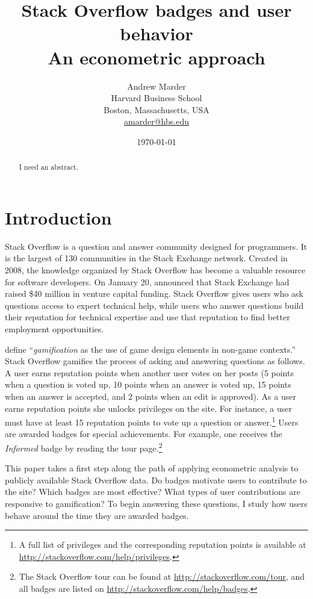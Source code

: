 \documentclass[conference]{IEEEtran}
\title{
  Stack Overflow badges and user behavior \\
  An econometric approach
}
\author{
  Andrew Marder \\
  Harvard Business School \\
  Boston, Massachusetts, USA \\
  \href{mailto:amarder@hbs.edu}{amarder@hbs.edu}
}
\date{\today}
\newcommand{\1}{\mathds{1}}
\begin{document}
\maketitle

\begin{abstract}
I need an abstract.
\end{abstract}

\section{Introduction}

Stack Overflow is a question and answer community designed for programmers. It is the largest of 130 communities in the Stack Exchange network. Created in 2008, the knowledge organized by Stack Overflow has become a valuable resource for software developers. On January 20, \citet{Spoelsky2015} announced that Stack Exchange had raised \$40 million in venture capital funding. Stack Overflow gives users who ask questions access to expert technical help, while users who answer questions build their reputation for technical expertise and use that reputation to find better employment opportunities.

\citet{Deterding2011} define ``\textit{gamification} as the use of game design elements in non-game contexts.'' Stack Overflow gamifies the process of asking and answering questions as follows. A user earns reputation points when another user votes on her posts (5 points when a question is voted up, 10 points when an answer is voted up, 15 points when an answer is accepted, and 2 points when an edit is approved). As a user earns reputation points she unlocks privileges on the site. For instance, a user must have at least 15 reputation points to vote up a question or answer.\footnote{A full list of privileges and the corresponding reputation points is available at \url{http://stackoverflow.com/help/privileges}.} Users are awarded badges for special achievements. For example, one receives the \textit{Informed} badge by reading the tour page.\footnote{The Stack Overflow tour can be found at \url{http://stackoverflow.com/tour}, and all badges are listed on \url{http://stackoverflow.com/help/badges}.}

This paper takes a first step along the path of applying econometric analysis to publicly available Stack Overflow data. Do badges motivate users to contribute to the site? Which badges are most effective? What types of user contributions are responsive to gamification? To begin answering these questions, I study how users behave around the time they are awarded badges.
\end{document}

